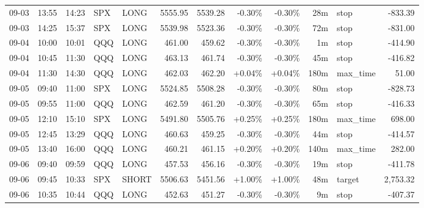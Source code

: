 \documentclass[11pt,a4paper,twoside]{article}
\begin{document}
\begin{center}
\begin{longtable}{>{\color{txtmain}}l l l l l r r r r r >{\color{txtmain}}l r}
09-03 & 13:55 & 14:23 & SPX & LONG & 5555.95 & 5539.28 & \textcolor{lossred}{-0.30\%} & \textcolor{lossred}{-0.30\%} & 28m & stop & \textcolor{lossred}{-833.39} \\
09-03 & 14:25 & 15:37 & SPX & LONG & 5539.98 & 5523.36 & \textcolor{lossred}{-0.30\%} & \textcolor{lossred}{-0.30\%} & 72m & stop & \textcolor{lossred}{-831.00} \\
09-04 & 10:00 & 10:01 & QQQ & LONG & 461.00 & 459.62 & \textcolor{lossred}{-0.30\%} & \textcolor{lossred}{-0.30\%} & 1m & stop & \textcolor{lossred}{-414.90} \\
09-04 & 10:45 & 11:30 & QQQ & LONG & 463.13 & 461.74 & \textcolor{lossred}{-0.30\%} & \textcolor{lossred}{-0.30\%} & 45m & stop & \textcolor{lossred}{-416.82} \\
09-04 & 11:30 & 14:30 & QQQ & LONG & 462.03 & 462.20 & \textcolor{wingreen}{+0.04\%} & \textcolor{wingreen}{+0.04\%} & 180m & max\_time & \textcolor{wingreen}{51.00} \\
09-05 & 09:40 & 11:00 & SPX & LONG & 5524.85 & 5508.28 & \textcolor{lossred}{-0.30\%} & \textcolor{lossred}{-0.30\%} & 80m & stop & \textcolor{lossred}{-828.73} \\
09-05 & 09:55 & 11:00 & QQQ & LONG & 462.59 & 461.20 & \textcolor{lossred}{-0.30\%} & \textcolor{lossred}{-0.30\%} & 65m & stop & \textcolor{lossred}{-416.33} \\
09-05 & 12:10 & 15:10 & SPX & LONG & 5491.80 & 5505.76 & \textcolor{wingreen}{+0.25\%} & \textcolor{wingreen}{+0.25\%} & 180m & max\_time & \textcolor{wingreen}{698.00} \\
09-05 & 12:45 & 13:29 & QQQ & LONG & 460.63 & 459.25 & \textcolor{lossred}{-0.30\%} & \textcolor{lossred}{-0.30\%} & 44m & stop & \textcolor{lossred}{-414.57} \\
09-05 & 13:40 & 16:00 & QQQ & LONG & 460.21 & 461.15 & \textcolor{wingreen}{+0.20\%} & \textcolor{wingreen}{+0.20\%} & 140m & max\_time & \textcolor{wingreen}{282.00} \\
09-06 & 09:40 & 09:59 & QQQ & LONG & 457.53 & 456.16 & \textcolor{lossred}{-0.30\%} & \textcolor{lossred}{-0.30\%} & 19m & stop & \textcolor{lossred}{-411.78} \\
09-06 & 09:45 & 10:33 & SPX & SHORT & 5506.63 & 5451.56 & \textcolor{wingreen}{+1.00\%} & \textcolor{wingreen}{+1.00\%} & 48m & target & \textcolor{wingreen}{2,753.32} \\
09-06 & 10:35 & 10:44 & QQQ & LONG & 452.63 & 451.27 & \textcolor{lossred}{-0.30\%} & \textcolor{lossred}{-0.30\%} & 9m & stop & \textcolor{lossred}{-407.37} \\

\end{longtable}
\end{center}
\end{document}
